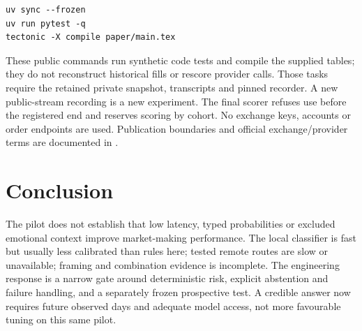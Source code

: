 \documentclass[11pt]{article}
\begin{document}
\begin{verbatim}
uv sync --frozen
uv run pytest -q
tectonic -X compile paper/main.tex
\end{verbatim}
These public commands run synthetic code tests and compile the supplied tables;
they do not reconstruct historical fills or rescore provider calls. Those tasks
require the retained private snapshot, transcripts and pinned recorder. A new
public-stream recording is a new experiment. The final scorer refuses use before
the registered end and reserves scoring by cohort. No exchange keys, accounts or
order endpoints are used. Publication boundaries and official exchange/provider
terms are documented in .

\section{Conclusion}
The pilot does not establish that low latency, typed probabilities or excluded
emotional context improve market-making performance. The local
classifier is fast but usually less calibrated than rules here; tested remote
routes are slow or unavailable; framing and combination evidence is incomplete.
The engineering response is a narrow gate around deterministic risk, explicit
abstention and failure handling, and a separately frozen prospective test. A
credible answer now requires future observed days and adequate model access,
not more favourable tuning on this same pilot.



\end{document}
